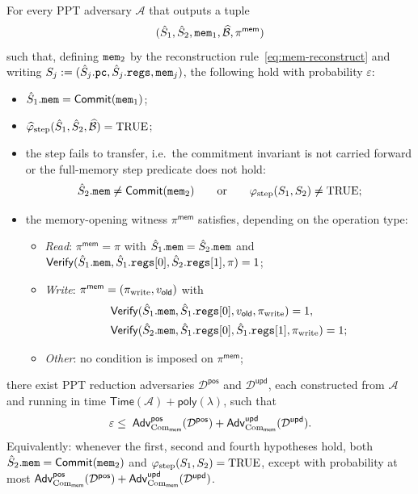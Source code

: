 \begin{proposition}
  \label{prop:memory-extractability}
For every PPT adversary $\mathcal{A}$ that outputs a tuple
$$(\hat{S}_1,\hat{S}_2,\mathtt{mem}_1,\widehat{\mathcal{B}},\pi^{\mathsf{mem}})$$
such that, defining $\mathtt{mem}_2$ by the reconstruction
rule~\eqref{eq:mem-reconstruct} and writing
$S_j:=(\hat{S}_j.\mathtt{pc},\hat{S}_j.\mathtt{regs},\mathtt{mem}_j)$, the following hold with
probability $\varepsilon$:
\begin{itemize}
  \item $\hat{S}_1.\mathtt{mem} = \mathsf{Commit}(\mathtt{mem}_1)$;
  \item $\widehat{\varphi}_{\mathrm{step}}(\hat{S}_1,\hat{S}_2,\widehat{\mathcal{B}})=\mathrm{TRUE}$;
  \item the step fails to transfer, i.e.\ the commitment invariant is not
    carried forward or the full-memory step predicate does not hold:
    \[
      \hat{S}_2.\mathtt{mem} \neq \mathsf{Commit}(\mathtt{mem}_2)
      \qquad\text{or}\qquad
      \varphi_{\mathrm{step}}(S_1,S_2)\neq\mathrm{TRUE};
    \]
  \item the memory-opening witness $\pi^{\mathsf{mem}}$ satisfies,
    depending on the operation type:
    \begin{itemize}
      \item \emph{Read}: $\pi^{\mathsf{mem}} = \pi$ with
        $\hat{S}_1.\mathtt{mem}=\hat{S}_2.\mathtt{mem}$ and
        $\mathsf{Verify}(\hat{S}_1.\mathtt{mem},\hat{S}_1.\mathtt{regs}[0],\hat{S}_2.\mathtt{regs}[1],\pi)=1$;
      \item \emph{Write}: $\pi^{\mathsf{mem}} = (\pi_{\mathrm{write}}, v_{\mathsf{old}})$ with
        \begin{align*}
        &\mathsf{Verify}(\hat{S}_1.\mathtt{mem},\hat{S}_1.\mathtt{regs}[0],v_{\mathsf{old}},\pi_{\mathrm{write}})=1,\\
        &\mathsf{Verify}(\hat{S}_2.\mathtt{mem},\hat{S}_1.\mathtt{regs}[0],\hat{S}_1.\mathtt{regs}[1],\pi_{\mathrm{write}})=1;
        \end{align*}
      \item \emph{Other}: no condition is imposed on $\pi^{\mathsf{mem}}$;
    \end{itemize}
\end{itemize}
there exist PPT reduction adversaries $\mathcal{D}^{\mathsf{pos}}$ and
$\mathcal{D}^{\mathsf{upd}}$, each constructed from $\mathcal{A}$ and running
in time $\mathsf{Time}(\mathcal{A})+\mathsf{poly}(\lambda)$, such that
\[
  \varepsilon \leq\;
  \mathsf{Adv}^{\mathsf{pos}}_{\mathrm{Com}_{\mathsf{mem}}}(\mathcal{D}^{\mathsf{pos}})
  + \mathsf{Adv}^{\mathsf{upd}}_{\mathrm{Com}_{\mathsf{mem}}}(\mathcal{D}^{\mathsf{upd}}).
\]
Equivalently: whenever the first, second and fourth hypotheses hold, both
$\hat{S}_2.\mathtt{mem}=\mathsf{Commit}(\mathtt{mem}_2)$ and
$\varphi_{\mathrm{step}}(S_1,S_2)=\mathrm{TRUE}$, except with probability at most
$\mathsf{Adv}^{\mathsf{pos}}_{\mathrm{Com}_{\mathsf{mem}}}(\mathcal{D}^{\mathsf{pos}})
+\mathsf{Adv}^{\mathsf{upd}}_{\mathrm{Com}_{\mathsf{mem}}}(\mathcal{D}^{\mathsf{upd}})$.
\end{proposition}

